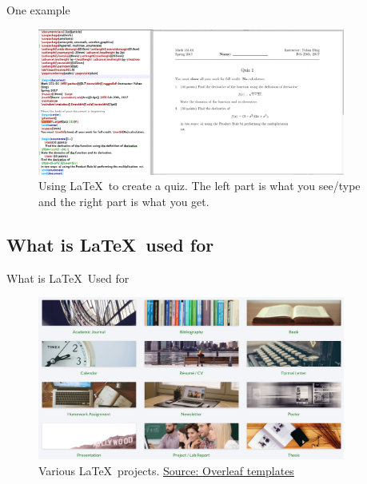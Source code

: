 \documentclass [xcolor=svgnames, t] {beamer}
\begin{document}
\begin{frame}{One example}
    \begin{figure}
        \centering
        \includegraphics[width = 0.90\textwidth]{figures/inputoutput.png}
        \caption{Using \LaTeX\ to create a quiz. The left part is what you see/type and the right part is what you get.}
    \end{figure}
\end{frame}

\subsection{What is \LaTeX\ used for}
\begin{frame}{What is \LaTeX\ Used for}
    \begin{figure}
        \centering
        \includegraphics[width = 0.90\textwidth]{figures/Templates.png}
        \caption{Various \LaTeX\ projects. \href{https://www.overleaf.com/latex/templates}{Source: Overleaf templates}}
    \end{figure}
\end{frame}
\end{document}
